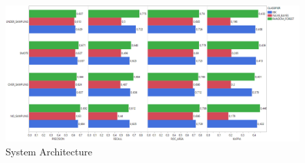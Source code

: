 \documentclass[sigconf]{acmart}
\begin{document}
 



\begin{figure}[h]
  \centering
  \includegraphics[width=\linewidth]{1 - BOOKKEEPER - SamplingNoFeatureSelection}
  \caption{System Architecture}
  \label{fig:BOOKKEEPER:SamplingNoFeatureSelection}
\end{figure}









\end{document}
